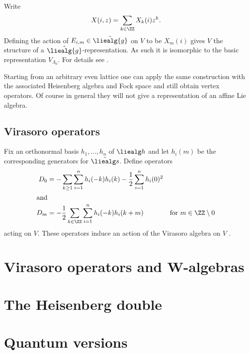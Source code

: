 \documentclass{ck-article}
\newcommand\affliealg[1]{\hat{\liealg{#1}}}
\begin{document}
Write
\[
    X(i, z) = \sum_{k \in \ZZ} X_k(i) z^k.
\]
Defining the action of $E_{i,m} \in \affliealg g$ on $V$ to be $X_m(i)$ gives $V$ the structure of a $\affliealg g$-representation.
As such it is isomorphic to the basic representation $V_{\Lambda_0}$.
For details see \cite[Theorem~1]{FrenkelKac:1980:BasicRepresentationsOfAffineLieAlgebras}.

\begin{Remark}
    Starting from an arbitrary even lattice one can apply the same construction with the associated Heisenberg algebra and Fock space and still obtain vertex operators.
    Of course in general they will not give a representation of an affine Lie algebra.
\end{Remark}

\subsection{Virasoro operators}

Fix an orthonormal basis $h_1,\dotsc, h_n$ of $\liealg h$ and let $h_i(m)$ be the corresponding generators for $\tilde{\liealg s}$.
Define operators
\begin{align*}
    D_0 &= -\sum_{k \ge 1} \sum_{i=1}^n h_i(-k)h_i(k) - \frac12\sum_{i=1}^n h_i(0)^2 \\
    \intertext{and}
    D_m &= -\frac12 \sum_{k \in \ZZ} \sum_{i=1}^n h_i(-k)h_i(k+m)& \text{for } m \in \ZZ \setminus 0
\end{align*}
acting on $V$.
These operators induce an action of the Virasoro algebra on $V$ \cite[Proposition~2.7]{FrenkelKac:1980:BasicRepresentationsOfAffineLieAlgebras}.

\section{Virasoro operators and W-algebras}

\section{The Heisenberg double}

\section{Quantum versions}

\printbibliography
\end{document}

